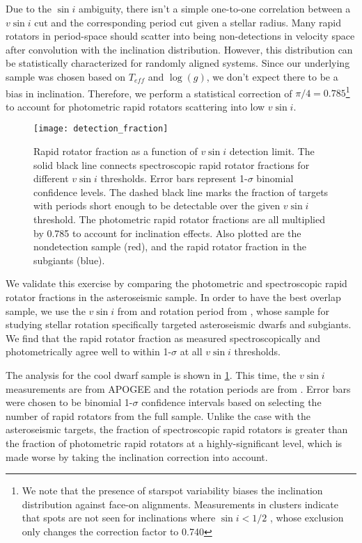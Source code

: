\documentclass[manuscript]{aastex6}
\newcommand{\vsini}{\ensuremath{v \sin i}}
\newcommand{\Teff}{\ensuremath{T_{eff}}}
\newcommand{\logg}{\ensuremath{\log(g)}}
\begin{document}
Due to the \(\sin i\) ambiguity, there isn't a simple one-to-one correlation
between a \vsini{} cut and the corresponding period cut given a stellar radius.
Many rapid rotators in period-space should scatter into being non-detections in
velocity space after convolution with the inclination distribution. However,
this distribution can be statistically characterized for randomly
aligned systems. Since our underlying sample was chosen based on
\Teff{} and \logg{}, we don't expect there to be a bias in inclination.
Therefore, we perform a statistical correction of \(\pi/4=0.785\)\footnote{We 
  note that the presence of starspot variability biases the
    inclination distribution against face-on alignments. Measurements
    in clusters indicate that spots are not seen for inclinations where 
    \(\sin i < 1/2\) \citep{Jackson10}, whose exclusion only changes the 
correction factor to 0.740} 
to account for photometric rapid rotators scattering into low
\vsini{}. 

\begin{figure}[htb]
    \centering
    \texttt{[image: detection\_fraction]}
    \caption{Rapid rotator fraction as a function of \vsini{} detection limit.
    The solid black line connects spectroscopic rapid rotator fractions for 
    different \vsini{} thresholds. Error bars represent 1-\(\sigma\) binomial 
    confidence levels. The dashed black line marks the fraction of targets 
    with \citet{McQuillan14} periods short enough to be detectable over the 
    given \vsini{} threshold. The photometric rapid rotator fractions are all 
    multiplied by 0.785 to account for inclination effects. Also plotted are
the \citet{McQuillan14} nondetection sample (red), and the rapid rotator
fraction in the subgiants (blue).\label{fig:detection_fraction}}
\end{figure}

We validate this exercise by comparing the photometric and spectroscopic
rapid rotator fractions in the asteroseismic sample. In order to have the best
overlap sample, we use the \vsini{} from \citet{Bruntt12} and rotation period 
from \citet{Garcia14}, whose sample for studying stellar rotation specifically
targeted asteroseismic dwarfs and subgiants. We find that the rapid rotator
fraction as measured spectroscopically and photometrically agree well to within
1-\(\sigma\) at all \vsini{} thresholds. 

The analysis for the cool dwarf sample is shown in 
\cref{fig:detection_fraction}. This time, the \vsini{} measurements
are from APOGEE and the rotation periods are from \citet{McQuillan14}. Error
bars were chosen to be binomial 1-\(\sigma\) confidence intervals based on
selecting the number of rapid rotators from the full sample. Unlike  
the case with the asteroseismic targets, the fraction of spectroscopic rapid
rotators is greater than the fraction of photometric rapid
rotators at a highly-significant level, which is made worse by taking the
inclination correction into account.
\end{document}
